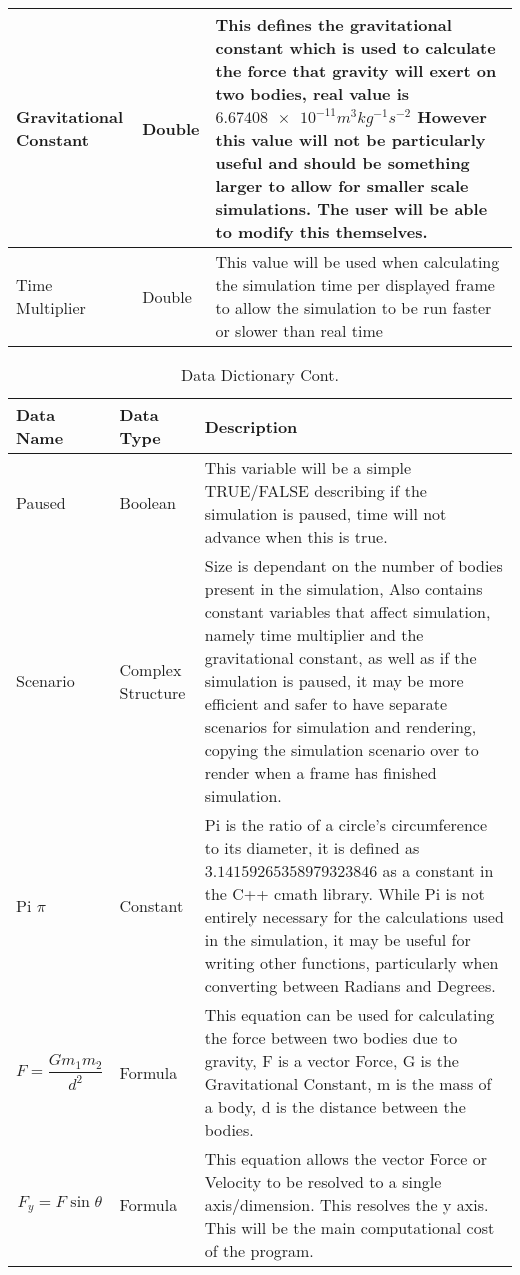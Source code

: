 \begin{table}[htbp]
\begin{tabular}{|M{3cm}|M{3cm}|m{8cm}|}
\hline
Gravitational Constant & Double & This defines the gravitational constant which is used to calculate the force that gravity will exert on two bodies, real value is $\num{6.67408e-11} m^{3} kg^{-1} s^{-2}$ However this value will not be particularly useful and should be something larger to allow for smaller scale simulations. The user will be able to modify this themselves. \\
\hline
Time Multiplier & Double & This value will be used when calculating the simulation time per displayed frame to allow the simulation to be run faster or slower than real time \\
\hline
\end{tabular}
\end{table} 

\begin{table}[htbp]
\caption{Data Dictionary Cont.}
\centering
\footnotesize
\def\arraystretch{1.5}
\begin{tabular}{|M{3cm}|M{3cm}|m{8cm}|}
\hline 
\textbf{Data Name} & \textbf{Data Type} & \textbf{Description} \\
\hline
Paused & Boolean & This variable will be a simple TRUE/FALSE describing if the simulation is paused, time will not advance when this is true. \\
\hline
Scenario & Complex Structure & Size is dependant on the number of bodies present in the simulation, Also contains constant variables that affect simulation, namely time multiplier and the gravitational constant, as well as if the simulation is paused, it may be more efficient and safer to have separate scenarios for simulation and rendering, copying the simulation scenario over to render when a frame has finished simulation. \\
\hline
Pi $\pi$ & Constant & Pi is the ratio of a circle's circumference to its diameter, it is defined as $3.14159265358979323846$ as a constant in the C++ cmath library. While Pi is not entirely necessary for the calculations used in the simulation, it may be useful for writing other functions, particularly when converting between Radians and Degrees. \\
\hline
$$F=\frac{Gm_1m_2}{d^2}$$ & Formula & This equation can be used for calculating the force between two bodies due to gravity, F is a vector Force, G is the Gravitational Constant, m is the mass of a body, d is the distance between the bodies. \\
\hline
$$F_y=F\sin{\theta}$$ & Formula & This equation allows the vector Force or Velocity to be resolved to a single axis/dimension. This resolves the y axis. This will be the main computational cost of the program. \\

\end{tabular}
\end{table}
